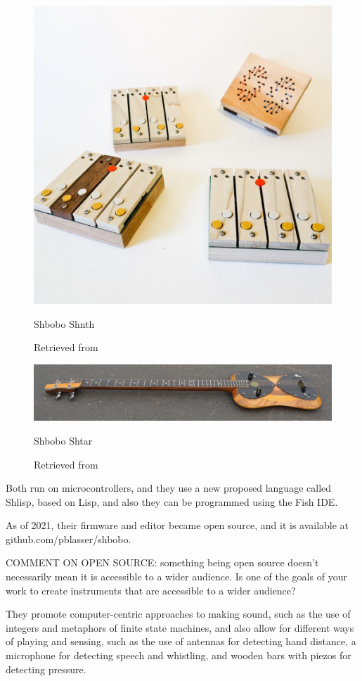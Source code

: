 \begin{figure}[ht]
  \centering
  \includegraphics[width=0.75\linewidth,height=0.25\textheight,keepaspectratio]{images/shbobo-shnth.jpg}
  \caption{Shbobo Shnth}
  \caption*{Retrieved from \cite{website-shbobo-current}}
  \label{fig:shbobo-shnth}
\end{figure}

\begin{figure}[ht]
  \centering
    \includegraphics[width=0.75\linewidth,height=0.25\textheight,keepaspectratio]{images/shbobo-shtar.jpg}
  \caption{Shbobo Shtar}
  \caption*{Retrieved from \cite{website-shbobo-current}}
  \label{fig:shbobo-shtar}
\end{figure}

Both run on microcontrollers, and they use a new proposed language called Shlisp, based on Lisp, and also they can be programmed using the Fish IDE.

As of 2021, their firmware and editor became open source, and it is available at github.com/pblasser/shbobo.

COMMENT ON OPEN SOURCE: something being open source doesn't necessarily mean it is accessible to a wider audience. Is one of the goals of your work to create instruments that are accessible to a wider audience?

They promote computer-centric approaches to making sound, such as the use of integers and metaphors of finite state machines, and also allow for different ways of playing and sensing, such as the use of antennas for detecting hand distance, a microphone for detecting speech and whistling, and wooden bars with piezos for detecting pressure.

